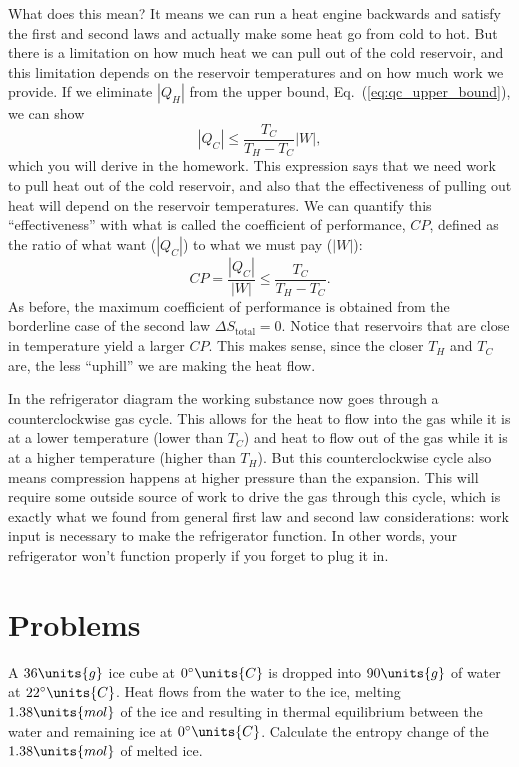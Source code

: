 What does this mean?  It means we can run a heat engine backwards and
satisfy the first and second laws and actually make some heat go from
cold to hot.  But there is a limitation on how much heat we can pull
out of the cold reservoir, and this limitation depends on the
reservoir temperatures and on how much work we provide.  If we
eliminate $|Q_H|$ from the upper bound, Eq.~(\ref{eq:qc_upper_bound}),
we can show
\begin{equation}
|Q_C| \leq \frac{T_C}{T_H-T_C} |W|,
\label{eq:qc_upper_bound_ii}
\end{equation}
which you will derive in the homework.  This expression says that we
need work to pull heat out of the cold reservoir, and also that the
effectiveness of pulling out heat will depend on the reservoir
temperatures.  We can quantify this ``effectiveness'' with what is
called the coefficient of performance, $CP$, defined as the ratio of
what want ($|Q_C|$) to what we must pay ($|W|$):
\begin{equation}
CP = \frac{|Q_C|}{|W|} \leq  \frac{T_C}{T_H-T_C}.
\end{equation}
As before, the maximum coefficient of performance is obtained from the
borderline case of the second law $\Delta S_\text{total}=0$.
Notice that reservoirs that are close in temperature yield a larger
$CP$.  This makes sense, since the closer $T_H$ and $T_C$ are, the
less ``uphill'' we are making the heat flow.

In the refrigerator diagram the working substance now goes
through a counterclockwise gas cycle.  This allows for the heat to
flow into the gas while it is at a lower temperature (lower than
$T_C$) and heat to flow out of the gas while it is at a higher
temperature (higher than $T_H$).  But this counterclockwise cycle also
means compression happens at higher pressure than the expansion.  This
will require some outside source of work to drive the gas through this
cycle, which is exactly what we found from general first law and
second law considerations: work input is necessary to make the
refrigerator function.  In other words, your refrigerator won't function
properly if you forget to plug it in.



\newpage

\section*{Problems}

\begin{problem} 
  A $36\units{g}$ ice cube at $0^\circ\units{C}$ is dropped into
  $90\units{g}$ of water at $22^\circ\units{C}$.  Heat flows from the
  water to the ice, melting $1.38\units{mol}$ of the ice 
  and resulting in thermal equilibrium between the water and 
  remaining ice at $0^\circ\units{C}$.
  Calculate the entropy change of the $1.38\units{mol}$ of melted ice.
\label{prob:iceintowater}
\end{problem}

